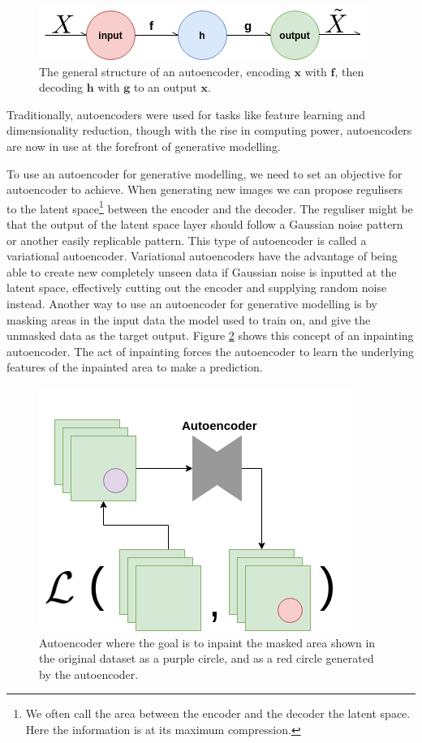\begin{figure}[t]
    \centering
    \includegraphics[scale=0.8]{background/figures/SimpleAE.png}
    \caption{The general structure of an autoencoder, encoding $\textbf{x}$ with $\textbf{f}$, then decoding $\textbf{h}$ with $\textbf{g}$ to an output $\textbf{x}$.}
    \label{fig:simpleAE}
\end{figure}

Traditionally, autoencoders were used for tasks like feature learning and dimensionality reduction, though with the rise in computing power, autoencoders are now in use at the forefront of generative modelling.

To use an autoencoder for generative modelling, we need to set an objective for autoencoder to achieve.
When generating new images we can propose regulisers to the latent space\footnote{We often call the area between the encoder and the decoder the latent space. Here the information is at its maximum compression.} between the encoder and the decoder. The reguliser might be that the output of the latent space layer should follow a Gaussian noise pattern or another easily replicable pattern. 
This type of autoencoder is called a variational autoencoder. Variational autoencoders have the advantage of being able to create new completely unseen data if Gaussian noise is inputted at the latent space, effectively cutting out the encoder and supplying random noise instead.
Another way to use an autoencoder for generative modelling is by masking areas in the input data the model used to train on, and give the unmasked data as the target output.
Figure \ref{fig:AEinpainting} shows this concept of an inpainting autoencoder. The act of inpainting forces the autoencoder to learn the underlying features of the inpainted area to make a prediction. 

\begin{figure}[t]
    \centering
    \includegraphics[scale=0.6]{background/figures/AE_for_inpainting.png}
    \caption{Autoencoder where the goal is to inpaint the masked area shown in the original dataset as a purple circle, and as a red circle generated by the autoencoder.}
    \label{fig:AEinpainting}
\end{figure}


